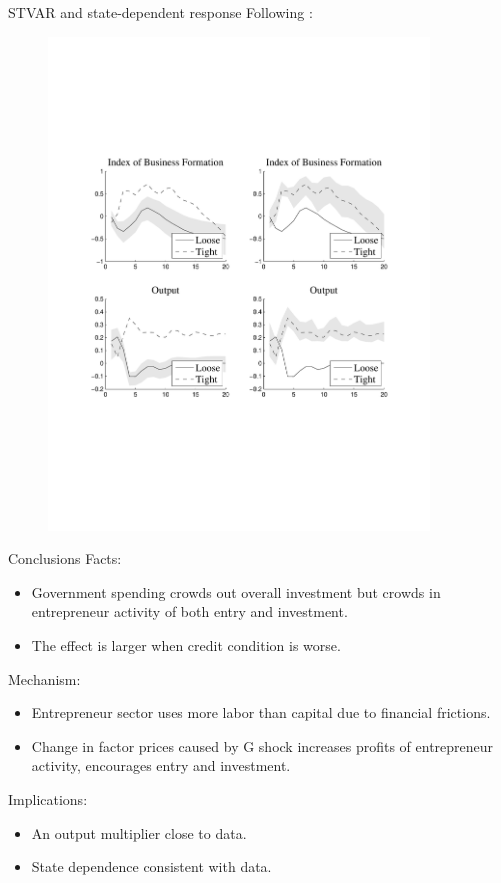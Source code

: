 \documentclass[svgnames]{beamer}
\begin{document}
\begin{frame}{STVAR and state-dependent response}
Following \citet{auerbach_measuring_2012}:
\begin{figure}[!ht]
\includegraphics[trim=1cm 6.5cm 1cm 6.5cm, clip=true, width=0.9\textwidth]{graph/GShockResStateData.pdf}
\end{figure}
\end{frame}

\begin{frame}{Conclusions}
Facts:
\begin{itemize}
\item Government spending crowds out overall investment but crowds in entrepreneur activity of both entry and investment.
\item The effect is larger when credit condition is worse.
\end{itemize}
Mechanism:
\begin{itemize}
\item Entrepreneur sector uses more labor than capital due to financial frictions.
\item Change in factor prices caused by G shock increases profits of entrepreneur activity, encourages entry and investment.
\end{itemize}
Implications:
\begin{itemize}
\item An output multiplier close to data.
\item State dependence consistent with data.
\end{itemize}
\end{frame}
\end{document}
